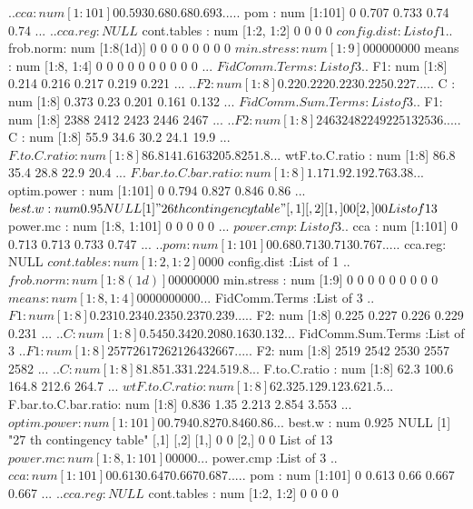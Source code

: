 \documentclass[11pt]{article} %
\begin{document}
\begin{Schunk}
\begin{Soutput}
  ..$ cca    : num [1:101] 0 0.593 0.68 0.68 0.693 ...
  ..$ pom    : num [1:101] 0 0.707 0.733 0.74 0.74 ...
  ..$ cca.reg: NULL
 $ cont.tables         : num [1:2, 1:2] 0 0 0 0
 $ config.dist         :List of 1
  ..$ frob.norm: num [1:8(1d)] 0 0 0 0 0 0 0 0
 $ min.stress          : num [1:9] 0 0 0 0 0 0 0 0 0
 $ means               : num [1:8, 1:4] 0 0 0 0 0 0 0 0 0 0 ...
 $ FidComm.Terms       :List of 3
  ..$ F1: num [1:8] 0.214 0.216 0.217 0.219 0.221 ...
  ..$ F2: num [1:8] 0.22 0.222 0.223 0.225 0.227 ...
  ..$ C : num [1:8] 0.373 0.23 0.201 0.161 0.132 ...
 $ FidComm.Sum.Terms   :List of 3
  ..$ F1: num [1:8] 2388 2412 2423 2446 2467 ...
  ..$ F2: num [1:8] 2463 2482 2492 2513 2536 ...
  ..$ C : num [1:8] 55.9 34.6 30.2 24.1 19.9 ...
 $ F.to.C.ratio        : num [1:8] 86.8 141.6 163 205.8 251.8 ...
 $ wtF.to.C.ratio      : num [1:8] 86.8 35.4 28.8 22.9 20.4 ...
 $ F.bar.to.C.bar.ratio: num [1:8] 1.17 1.9 2.19 2.76 3.38 ...
 $ optim.power         : num [1:101] 0 0.794 0.827 0.846 0.86 ...
 $ best.w              : num 0.95
NULL
[1] "26 th contingency table"
     [,1] [,2]
[1,]    0    0
[2,]    0    0
List of 13
 $ power.mc            : num [1:8, 1:101] 0 0 0 0 0 ...
 $ power.cmp           :List of 3
  ..$ cca    : num [1:101] 0 0.713 0.713 0.733 0.747 ...
  ..$ pom    : num [1:101] 0 0.68 0.713 0.713 0.767 ...
  ..$ cca.reg: NULL
 $ cont.tables         : num [1:2, 1:2] 0 0 0 0
 $ config.dist         :List of 1
  ..$ frob.norm: num [1:8(1d)] 0 0 0 0 0 0 0 0
 $ min.stress          : num [1:9] 0 0 0 0 0 0 0 0 0
 $ means               : num [1:8, 1:4] 0 0 0 0 0 0 0 0 0 0 ...
 $ FidComm.Terms       :List of 3
  ..$ F1: num [1:8] 0.231 0.234 0.235 0.237 0.239 ...
  ..$ F2: num [1:8] 0.225 0.227 0.226 0.229 0.231 ...
  ..$ C : num [1:8] 0.545 0.342 0.208 0.163 0.132 ...
 $ FidComm.Sum.Terms   :List of 3
  ..$ F1: num [1:8] 2577 2617 2621 2643 2667 ...
  ..$ F2: num [1:8] 2519 2542 2530 2557 2582 ...
  ..$ C : num [1:8] 81.8 51.3 31.2 24.5 19.8 ...
 $ F.to.C.ratio        : num [1:8] 62.3 100.6 164.8 212.6 264.7 ...
 $ wtF.to.C.ratio      : num [1:8] 62.3 25.1 29.1 23.6 21.5 ...
 $ F.bar.to.C.bar.ratio: num [1:8] 0.836 1.35 2.213 2.854 3.553 ...
 $ optim.power         : num [1:101] 0 0.794 0.827 0.846 0.86 ...
 $ best.w              : num 0.925
NULL
[1] "27 th contingency table"
     [,1] [,2]
[1,]    0    0
[2,]    0    0
List of 13
 $ power.mc            : num [1:8, 1:101] 0 0 0 0 0 ...
 $ power.cmp           :List of 3
  ..$ cca    : num [1:101] 0 0.613 0.647 0.667 0.687 ...
  ..$ pom    : num [1:101] 0 0.613 0.66 0.667 0.667 ...
  ..$ cca.reg: NULL
 $ cont.tables         : num [1:2, 1:2] 0 0 0 0

\end{Soutput}
\end{Schunk}
\end{document}
